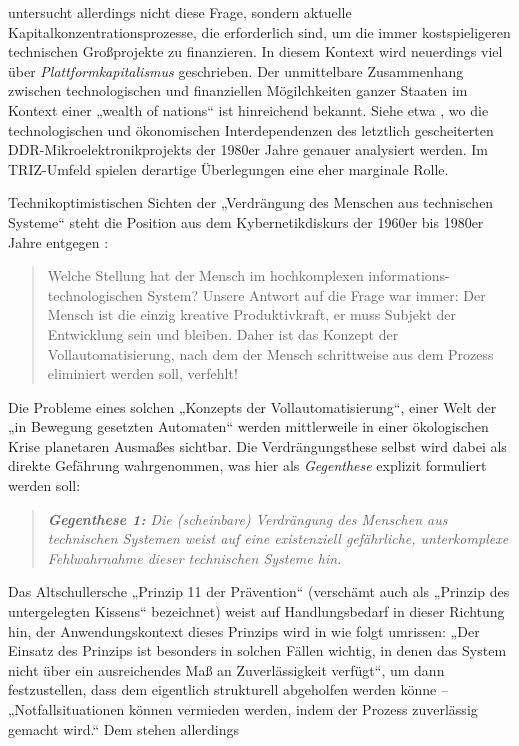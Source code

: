 \documentclass[11pt,a4paper]{article}
\begin{document}
\cite{Goldberg2016} untersucht allerdings nicht diese Frage, sondern aktuelle
Kapitalkonzentrationsprozesse, die erforderlich sind, um die immer
kostspieligeren technischen Großprojekte zu finanzieren.  In diesem Kontext
wird neuerdings viel über \emph{Plattformkapitalismus} geschrieben.  Der
unmittelbare Zusammenhang zwischen technologischen und finanziellen
Mögilchkeiten ganzer Staaten im Kontext einer „wealth of nations“ ist
hinreichend bekannt. Siehe etwa \cite{Barkleit2000}, wo die technologischen
und ökonomischen Interdependenzen des letztlich gescheiterten
DDR-Mikroelektronikprojekts der 1980er Jahre genauer analysiert werden. Im
TRIZ-Umfeld spielen derartige Überlegungen eine eher marginale Rolle.

Technikoptimistischen Sichten der „Verdrängung des Menschen aus technischen
Systeme“ steht die Position aus dem Kybernetikdiskurs der 1960er bis 1980er
Jahre entgegen \cite[S. 10]{KFK2000}:
\begin{quote}
  Welche Stellung hat der Mensch im hochkomplexen informations-technologischen
  System? Unsere Antwort auf die Frage war immer: Der Mensch ist die einzig
  kreative Produktivkraft, er muss Subjekt der Entwicklung sein und bleiben.
  Daher ist das Konzept der Vollautomatisierung, nach dem der Mensch
  schrittweise aus dem Prozess eliminiert werden soll, verfehlt!
\end{quote}
Die Probleme eines solchen „Konzepts der Vollautomatisierung“, einer Welt der
„in Bewegung gesetzten Automaten“ werden mittlerweile in einer ökologischen
Krise planetaren Ausmaßes sichtbar. Die Verdrängungsthese selbst wird dabei
als direkte Gefährung wahrgenommen, was hier als \emph{Gegenthese} explizit
formuliert werden soll:
\begin{quote}\it
  \textbf{Gegenthese 1:} Die (scheinbare) Verdrängung des Menschen aus
  technischen Systemen weist auf eine existenziell gefährliche, unterkomplexe
  Fehlwahrnahme dieser technischen Systeme hin.
\end{quote}
Das Altschullersche „Prinzip 11 der Prävention“ (verschämt auch als „Prinzip
des untergelegten Kissens“ bezeichnet) weist auf Handlungsbedarf in dieser
Richtung hin, der Anwendungskontext dieses Prinzips wird in \cite{TT} wie
folgt umrissen: „Der Einsatz des Prinzips ist besonders in solchen Fällen
wichtig, in denen das System nicht über ein ausreichendes Maß an
Zuverlässigkeit verfügt“, um dann festzustellen, dass dem eigentlich
strukturell abgeholfen werden könne -- „Notfallsituationen können vermieden
werden, indem der Prozess zuverlässig gemacht wird.“ Dem stehen allerdings
\end{document}
